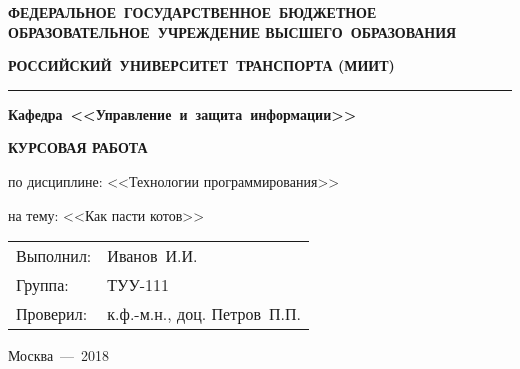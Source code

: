 \begin{titlepage}

	\centering
	{\normalsize \bfseries ФЕДЕРАЛЬНОЕ~ГОСУДАРСТВЕННОЕ~БЮДЖЕТНОЕ ОБРАЗОВАТЕЛЬНОЕ~УЧРЕЖДЕНИЕ ВЫСШЕГО~ОБРАЗОВАНИЯ\par}
	
	\vspace{1cm}

	{\normalsize \bfseries РОССИЙСКИЙ~УНИВЕРСИТЕТ~ТРАНСПОРТА (МИИТ) \par}

	\vspace{0.5cm}

	\noindent\rule{12cm}{0.4pt}

    \vspace{1cm}
    
	{\normalsize \bfseries Кафедра~<<Управление~и~защита~информации>> \par}

	\vspace{4cm}


    {\Large \bfseries КУРСОВАЯ РАБОТА\par}
    {\large по дисциплине: <<Технологии программирования>> \par}
    {\large на тему: <<Как пасти котов>> \par}

    \vfill

    \begin{flushright}
        \begin{tabular}{l l}
            {\normalsize Выполнил: } & {\normalsize Иванов~И.И. } \\
            {\normalsize Группа: }   & {\normalsize ТУУ-111 } \\
            {\normalsize Проверил: } & {\normalsize к.ф.-м.н., доц. Петров~П.П. } \\
        \end{tabular}
    \end{flushright}

    \vspace{\fill}
    
	{\normalsize Москва~---~2018\par}
	
\end{titlepage}